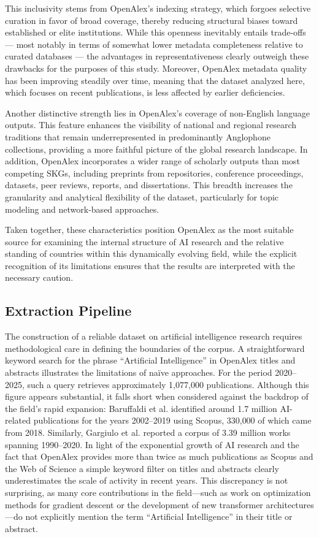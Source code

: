 \documentclass{article}
\begin{document}
This inclusivity stems from OpenAlex’s indexing strategy, which forgoes selective curation in favor of broad coverage, thereby reducing structural biases toward established or elite institutions. While this openness inevitably entails trade-offs — most notably in terms of somewhat lower metadata completeness relative to curated databases — the advantages in representativeness clearly outweigh these drawbacks for the purposes of this study. Moreover, OpenAlex metadata quality has been improving steadily over time, meaning that the dataset analyzed here, which focuses on recent publications, is less affected by earlier deficiencies.

Another distinctive strength lies in OpenAlex’s coverage of non-English language outputs. This feature enhances the visibility of national and regional research traditions that remain underrepresented in predominantly Anglophone collections, providing a more faithful picture of the global research landscape. In addition, OpenAlex incorporates a wider range of scholarly outputs than most competing SKGs, including preprints from repositories, conference proceedings, datasets, peer reviews, reports, and dissertations. This breadth increases the granularity and analytical flexibility of the dataset, particularly for topic modeling and network-based approaches.

Taken together, these characteristics position OpenAlex as the most suitable source for examining the internal structure of AI research and the relative standing of countries within this dynamically evolving field, while the explicit recognition of its limitations ensures that the results are interpreted with the necessary caution.


\subsection{Extraction Pipeline}

The construction of a reliable dataset on artificial intelligence research requires methodological care in defining the boundaries of the corpus. A straightforward keyword search for the phrase ``Artificial Intelligence'' in OpenAlex titles and abstracts illustrates the limitations of naïve approaches. For the period 2020–2025, such a query retrieves approximately 1{,}077{,}000 publications. Although this figure appears substantial, it falls short when considered against the backdrop of the field’s rapid expansion: Baruffaldi et al. identified around 1.7 million AI-related publications for the years 2002–2019 using Scopus, 330{,}000 of which came from 2018. \cite{baruffaldi2020identifying} Similarly, Gargiulo et al. reported a corpus of 3.39 million works spanning 1990–2020. \cite{gargiulo2022cartography} In light of the exponential growth of AI research and the fact that OpenAlex provides more than twice as much publications as Scopus and the Web of Science a simple keyword filter on titles and abstracts clearly underestimates the scale of activity in recent years. This discrepancy is not surprising, as many core contributions in the field—such as work on optimization methods for gradient descent or the development of new transformer architectures—do not explicitly mention the term ``Artificial Intelligence'' in their title or abstract.
\end{document}
